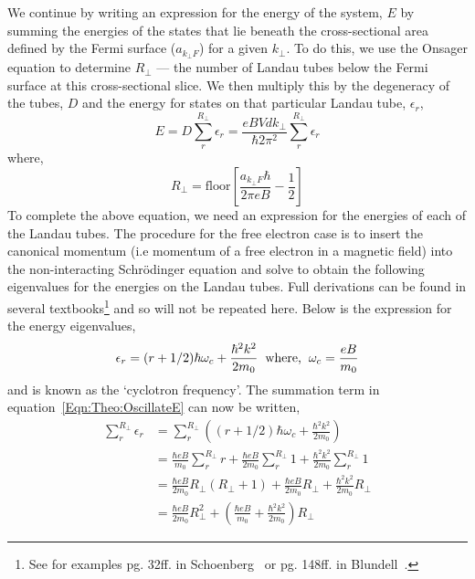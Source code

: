We continue by writing an expression for the energy of the system, $E$ by summing the energies of the states that lie beneath the cross-sectional area defined by the Fermi surface ($a_{k_\perp F}$) for a given $k_\perp$. To do this, we use the Onsager equation to determine $R_\perp$ --- the number of Landau tubes below the Fermi surface at this cross-sectional slice. We then multiply this by the degeneracy of the tubes, $D$ and the energy for states on that particular Landau tube, $\epsilon_r$,
\begin{equation}
\label{Eqn:Theo:OscillateE}
E = D\sum_{r}^{R_\perp}\epsilon_r = \frac{eBVdk_\perp}{\hbar 2 \pi^2}\sum_{r}^{R_\perp}\epsilon_r
\end{equation}
 where,
\begin{equation}
R_\perp = \textrm{floor}\left[\frac{a_{k_\perp F}\hbar}{2\pi e B} - \frac{1}{2}\right]
\end{equation}
To complete the above equation, we need an expression for the energies of each of the Landau tubes. The procedure for the free electron case is to insert the canonical momentum (i.e momentum of a free electron in a magnetic field) into the non-interacting Schr\"odinger equation and solve to obtain the following eigenvalues for the energies on the Landau tubes. Full derivations can be found in several textbooks\footnote{See for examples pg. 32ff. in Schoenberg~\cite{Schoenberg1984} or pg. 148ff. in Blundell~\cite{Blundell2001}.} and so will  not be repeated here. Below is the expression for the energy eigenvalues,
\begin{equation}
\epsilon_r=(r+1/2) \hbar \omega_c + \frac{\hbar^2 k^2}{2m_0} \textrm{\hspace{0.2cm}where,\hspace{0.2cm}} \omega_c = \frac{eB}{m_0}
\end{equation}
and is known as the `cyclotron frequency'. The summation term in equation~\ref{Eqn:Theo:OscillateE} can now be written,
\begin{align*}
\sum_r^{R_\perp}\epsilon_r &= \sum_r^{R_\perp}\left( (r+1/2) \hbar \omega_c + \frac{\hbar^2 k^2}{2m_0} \right) \\
    &= \frac{\hbar eB}{m_0}\sum_r^{R_\perp}r + \frac{\hbar eB}{2m_0}\sum_r^{R_\perp}1 + \frac{\hbar^2 k^2}{2m_0}\sum_r^{R_\perp}1 \\
    &= \frac{\hbar eB}{2 m_0} R_\perp(R_\perp + 1) + \frac{\hbar eB}{2m_0}R_\perp + \frac{\hbar^2 k^2}{2m_0}R_\perp \\
    &= \frac{\hbar eB}{2m_0}R_\perp^2 + \left(\frac{\hbar eB}{m_0} + \frac{\hbar^2 k^2}{2m_0}\right)R_\perp
\end{align*}
